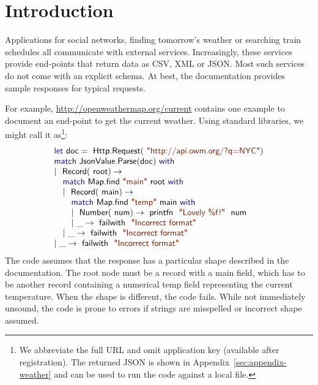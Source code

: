 \documentclass[pldi-cameraready]{sigplanconf-pldi16}
\newcommand{\kvd}[1]{\textnormal{\textcolor{kvdclr}{\sffamily #1}}}
\newcommand{\str}[1]{\textnormal{\textcolor{strclr}{\sffamily "#1"}}}
\newcommand{\strf}[1]{\textnormal{\textcolor{strclr}{\sffamily #1}}}
\newcommand{\ident}[1]{\textnormal{\sffamily #1}}
\begin{document}
\section{Introduction}
\label{sec:introduction}

Applications for social networks, finding tomorrow's weather or searching train schedules
all communicate with external services. Increasingly, these services provide end-points that return
data as CSV, XML or JSON. Most such services do not come with an explicit schema. At best, the
documentation provides sample responses for typical requests.

For example, \url{http://openweathermap.org/current} contains one example to document an end-point
to get the current weather. Using standard libraries, we might call it as\footnote{We abbreviate
the full URL and omit application key (available after registration). The returned JSON is shown
in Appendix~\ref{sec:appendix-weather} and can be used to run the code against a local file.}:
%
\begin{equation*}
\begin{array}{l}
 \kvd{let}~\ident{doc}=\ident{Http.Request}(\str{http://api.owm.org/?q=NYC}) \\
 \kvd{match}~\ident{JsonValue.Parse}(\ident{doc})~\kvd{with} \\
 |~\ident{Record}(\ident{root})\rightarrow \\
 \quad \kvd{match}~\ident{Map.find}~\str{main}~\ident{root}~\kvd{with} \\
 \quad |~\ident{Record}(\ident{main})\rightarrow \\
 \quad \quad \kvd{match}~\ident{Map.find}~\str{temp}~\ident{main}~\kvd{with} \\
 \quad \quad |~\ident{Number}(\ident{num})\rightarrow \ident{printfn}~\str{Lovely \%f!}~\ident{num} \\
 \quad \quad |~\_\rightarrow \ident{failwith}~\str{Incorrect format} \\
 \quad |~\_\rightarrow \ident{failwith}~\str{Incorrect format} \\
 |~\_\rightarrow \ident{failwith}~\str{Incorrect format}
\end{array}
\end{equation*}
%
The code assumes that the response has a particular shape described in the documentation. The
root node must be a record with a \strf{main} field, which has to be another record containing
a numerical \strf{temp} field representing the current temperature. When the shape is different,
the code fails. While not immediately unsound, the code is prone to errors if strings are
misspelled or incorrect shape assumed.
\end{document}
